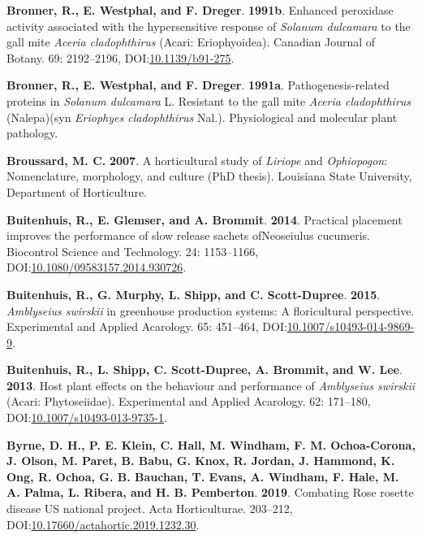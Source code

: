\documentclass[12pt,final,CPage]{ufthesis}
\newlength{\cslhangindent}
\newenvironment{CSLReferences}[2] %
{%
	\setlength{\parindent}{0pt}
	\ifodd #1 \everypar{\setlength{\hangindent}{\cslhangindent}}\ignorespaces\fi
	\ifnum #2 > 0
	\setlength{\parskip}{#2\baselineskip}
	\fi
}%
{}
\begin{document}
{\begin{CSLReferences}{1}{0}
  \leavevmode{}%
  \textbf{Bronner, R., E. Westphal, and F. Dreger}. \textbf{1991b}. Enhanced peroxidase activity associated with the hypersensitive response of {\emph{Solanum dulcamara}} to the gall mite {\emph{Aceria cladophthirus}} ({Acari}: {Eriophyoidea}). Canadian Journal of Botany. 69: 2192--2196, DOI:\href{https://doi.org/10.1139/b91-275}{10.1139/b91-275}.

  \leavevmode{}%
  \textbf{Bronner, R., E. Westphal, and F. Dreger}. \textbf{1991a}. Pathogenesis-related proteins in {\emph{Solanum dulcamara}} {L.} Resistant to the gall mite {\emph{Aceria cladophthirus}} ({Nalepa})(syn {\emph{Eriophyes cladophthirus}} {Nal.}). Physiological and molecular plant pathology.

  \leavevmode{}%
  \textbf{Broussard, M. C.} \textbf{2007}. A horticultural study of {\emph{Liriope}} and {\emph{Ophiopogon}}: Nomenclature, morphology, and culture (PhD thesis). Louisiana State University, Department of Horticulture.

  \leavevmode{}%
  \textbf{Buitenhuis, R., E. Glemser, and A. Brommit}. \textbf{2014}. Practical placement improves the performance of slow release sachets {ofNeoseiulus} cucumeris. Biocontrol Science and Technology. 24: 1153--1166, DOI:\href{https://doi.org/10.1080/09583157.2014.930726}{10.1080/09583157.2014.930726}.

  \leavevmode{}%
  \textbf{Buitenhuis, R., G. Murphy, L. Shipp, and C. Scott-Dupree}. \textbf{2015}. {\emph{Amblyseius swirskii}} in greenhouse production systems: A floricultural perspective. Experimental and Applied Acarology. 65: 451--464, DOI:\href{https://doi.org/10.1007/s10493-014-9869-9}{10.1007/s10493-014-9869-9}.

  \leavevmode{}%
  \textbf{Buitenhuis, R., L. Shipp, C. Scott-Dupree, A. Brommit, and W. Lee}. \textbf{2013}. Host plant effects on the behaviour and performance of {\emph{Amblyseius swirskii}} ({Acari}: {Phytoseiidae}). Experimental and Applied Acarology. 62: 171--180, DOI:\href{https://doi.org/10.1007/s10493-013-9735-1}{10.1007/s10493-013-9735-1}.

  \leavevmode{}%
  \textbf{Byrne, D. H., P. E. Klein, C. Hall, M. Windham, F. M. Ochoa-Corona, J. Olson, M. Paret, B. Babu, G. Knox, R. Jordan, J. Hammond, K. Ong, R. Ochoa, G. B. Bauchan, T. Evans, A. Windham, F. Hale, M. A. Palma, L. Ribera, and H. B. Pemberton}. \textbf{2019}. Combating {Rose rosette disease} {US} national project. Acta Horticulturae. 203--212, DOI:\href{https://doi.org/10.17660/actahortic.2019.1232.30}{10.17660/actahortic.2019.1232.30}.


\end{CSLReferences}}
\end{document}
